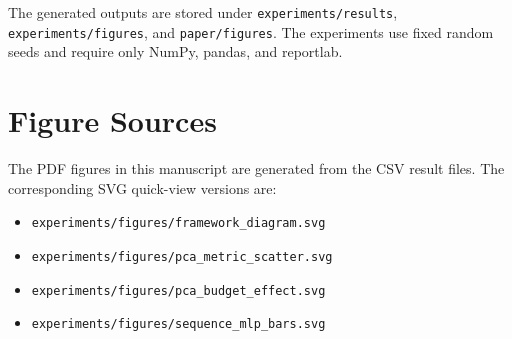\documentclass[11pt]{article}
\begin{document}
The generated outputs are stored under \texttt{experiments/results}, \texttt{experiments/figures}, and \texttt{paper/figures}. The experiments use fixed random seeds and require only NumPy, pandas, and reportlab.

\section{Figure Sources}

The PDF figures in this manuscript are generated from the CSV result files. The corresponding SVG quick-view versions are:
\begin{itemize}[leftmargin=*]
  \item \texttt{experiments/figures/framework\_diagram.svg}
  \item \texttt{experiments/figures/pca\_metric\_scatter.svg}
  \item \texttt{experiments/figures/pca\_budget\_effect.svg}
  \item \texttt{experiments/figures/sequence\_mlp\_bars.svg}
\end{itemize}



\end{document}
